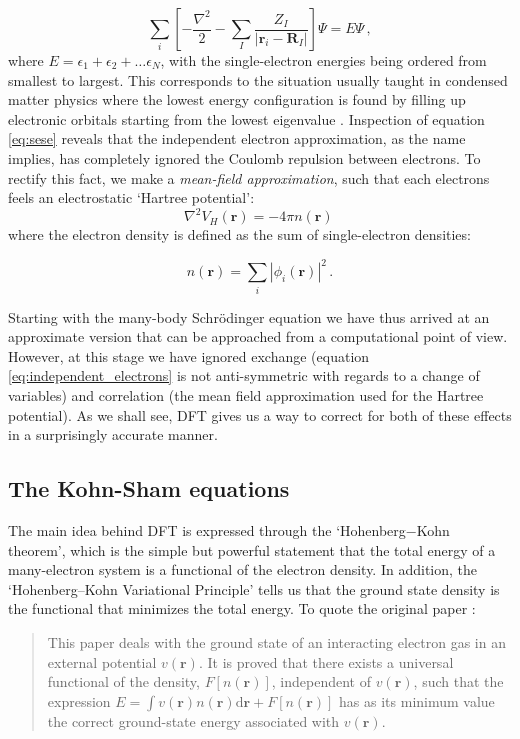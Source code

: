 %
\begin{equation}\label{eq:sese}
\sum_i \left[ - \frac{\nabla^2}{2} - \sum_I \frac{Z_I}{|\bm{r}_i - \bm{R}_I|} \right] \Psi = E \Psi \, , 
\end{equation}
%
where $E = \epsilon_1 + \epsilon_2 + \dots \epsilon_N$, with the single-electron energies being ordered from smallest to largest. This corresponds to the situation usually taught in condensed matter physics where the lowest energy configuration is found by filling up electronic orbitals starting from the lowest eigenvalue \cite{Kittel2005}. Inspection of equation \ref{eq:sese} reveals that the independent electron approximation, as the name implies, has completely ignored the Coulomb repulsion between electrons. To rectify this fact, we make a \emph{mean-field approximation}, such that each electrons feels an electrostatic `Hartree potential':
%
\[ \nabla^2 V_H(\bm{r}) = - 4 \pi n(\bm{r}) \, \] 
%
where the electron density is defined as the sum of single-electron densities:

\begin{equation}\label{eq:electron_density}
n(\bm{r}) = \sum_i |\phi_i(\bm{r})|^2 \, .
\end{equation}

\noindent Starting with the many-body Schr\"odinger equation we have thus arrived at an approximate version that can be approached from a computational point of view. However, at this stage we have ignored exchange (equation \eqref{eq:independent_electrons} is not anti-symmetric with regards to a change of variables) and correlation (the mean field approximation used for the Hartree potential). As we shall see, DFT gives us a way to correct for both of these effects in a surprisingly accurate manner.

\subsection{The Kohn-Sham equations}
The main idea behind DFT is expressed through the `Hohenberg−Kohn theorem', which is the simple but powerful statement that the total energy of a many-electron system is a functional of the electron density. In addition, the `Hohenberg–Kohn Variational Principle' tells us that the ground state density is the functional that minimizes the total energy. To quote the original paper \cite{Hohenberg1964}:

\begin{quote}
	This paper deals with the ground state of an interacting electron gas in an external potential $v(\bm{r})$. It is proved that there exists a universal functional of the density, $F[n(\bm{r})]$, independent of $v(\bm{r})$, such that the expression $E= \int v(\bm{r}) n(\bm{r}) \mathrm{d}\bm{r} + F[n(\bm{r})]$ has as its minimum value the correct ground-state energy associated with $v(\bm{r})$.
\end{quote}

